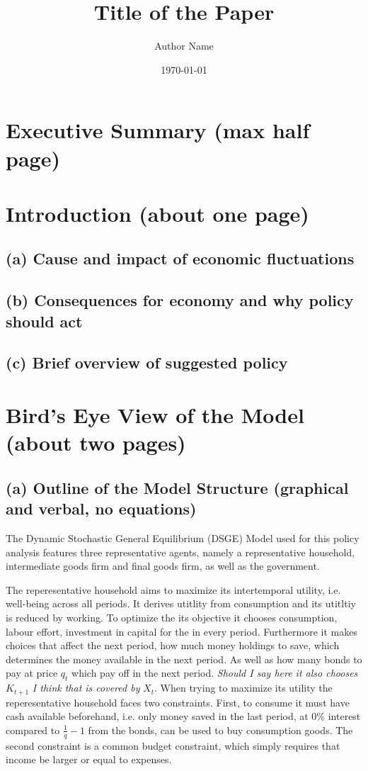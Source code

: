 \documentclass[12pt]{article}
\title{Title of the Paper}
\author{Author Name}
\date{\today}
\begin{document}
\maketitle

\section{Executive Summary (max half page)}

\section{Introduction (about one page) }
\subsection{(a) Cause and impact of economic fluctuations} 
\subsection{(b) Consequences for economy and why policy should act} 
\subsection{(c) Brief overview of suggested policy} 

\section{Bird’s Eye View of the Model (about two pages) }
\subsection{(a) Outline of the Model Structure (graphical and verbal, no equations) }
The Dynamic Stochastic General Equilibrium (DSGE) Model used for this policy analysis features
three representative agents, namely a representative household, intermediate goods firm and final goods firm, 
as well as the government. 

The reperesentative household aims to maximize its intertemporal utility, i.e. well-being 
across all periods. It derives utitlity from consumption and its utitltiy is reduced by working. To optimize the its objective
it chooses consumption, labour effort, investment in capital for the in every period. %
Furthermore it makes choices that affect the next period,  how much money holdings to save, which determines the money available
in the next period. As well as how many bonds to pay at price $q_t$ which pay off in the next period. \emph{Should 
I say here it also chooses}$K_{t+1}$ \emph{I think that is covered by } $X_t$. When trying to maximize its utility
the reperesentative household faces two constraints. First, to consume it must have cash available beforehand, i.e. only money 
saved in the last period, at 0\% interest compared to $\frac{1}{q} -1$ from the bonds, can be used to buy consumption goods. 
The second constraint is a common budget constraint, which simply requires that income be larger or equal to expenses. 
\end{document}
